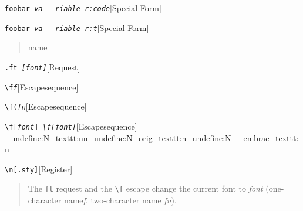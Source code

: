 \documentclass{book}
\newcommand\GNUTexinfocommandstyletextvar[1]{{\normalfont{}\textsl{#1}}}%
\begin{document}
%
\noindent\texttt{foobar \EmbracOn{}\textnormal{\textsl{\EmbracOff{}\textnormal{\texttt{va{-}{-}{-}riable}}\EmbracOn{} r:code}}\EmbracOff{}}\hfill[Special Form]

%
\noindent\texttt{foobar \EmbracOn{}\textnormal{\textsl{\EmbracOff{}\textnormal{\texttt{va{-}{-}{-}riable}}\EmbracOn{} r:t}}\EmbracOff{}}\hfill[Special Form]

%
\begin{quote}
\unskip{\parskip=0pt\noindent}%
name
\end{quote}

\noindent\texttt{\texttt{.ft} \EmbracOn{}\textnormal{\textsl{[\EmbracOff{}\textnormal{\textsl{font}}\EmbracOn{}]}}\EmbracOff{}}\hfill[Request]

%
\noindent\texttt{\texttt{\textbackslash{}f}\textnormal{\textsl{f}}\texttt{}}\hfill[Escape\hbox{}sequence]

%
\noindent\texttt{\texttt{\textbackslash{}f(}\textnormal{\textsl{fn}}\texttt{}}\hfill[Escape\hbox{}sequence]

%
\noindent\texttt{\texttt{\textbackslash{}f[}\textnormal{\textsl{font}}\texttt{]} \EmbracOn{}\textnormal{\textsl{\texttt{\textbackslash{}f[}\EmbracOff{}\textnormal{\textsl{font}}\EmbracOn{}\texttt{]}}}\EmbracOff{}}\hfill[Escape\hbox{}sequence]
\ExplSyntaxOn%
\cs_undefine:N{\embrac_texttt:nn}\cs_undefine:N{\embrac_orig_texttt:n}\cs_undefine:N{\__embrac_texttt:n}%
\ExplSyntaxOff%

%
\noindent\texttt{\texttt{\textbackslash{}n[.sty]}}\hfill[Register]

%
\begin{quote}
\unskip{\parskip=0pt\noindent}%
The \texttt{ft} request and the \texttt{\textbackslash{}f} escape change the current font
to \GNUTexinfocommandstyletextvar{font} (one-character name\hbox{}\GNUTexinfocommandstyletextvar{f}, two-character name
\GNUTexinfocommandstyletextvar{fn}).
\end{quote}
\end{document}
